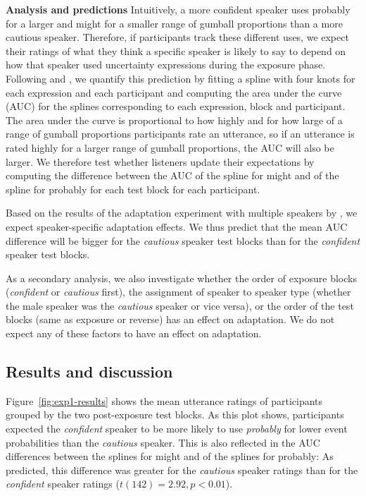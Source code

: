 \noindent \textbf{Analysis and predictions} 
Intuitively, a more confident speaker uses {\sc probably} for a larger and {\sc might} 
for a smaller range of gumball proportions than a more cautious speaker. Therefore, 
if participants track these different uses, we expect their ratings of what they think 
a specific speaker is likely to say to depend on how that speaker used 
uncertainty expressions during the exposure phase. Following \cite{Yildirim2016} and 
\cite{Schuster2018}, we quantify this prediction by fitting a spline with four knots for each 
expression and each participant and computing the area under the curve (AUC) for the splines 
corresponding to each expression, block and participant. The area under the curve is proportional 
to how highly and for how large of a range of gumball proportions participants rate an utterance, so 
if an utterance is rated highly for a larger range of gumball proportions, the AUC will also be larger. 
We therefore test whether listeners update their expectations by computing the difference between 
the AUC of the spline for {\sc might} and of the spline for {\sc probably} for each test block for each 
participant. 

Based on the results of the adaptation experiment with multiple speakers by \cite{Yildirim2016},
we expect speaker-specific adaptation effects. We thus predict that the mean AUC difference
will be bigger for the \emph{cautious} speaker test blocks than for the \emph{confident} speaker test blocks.

As a secondary analysis, we also investigate whether the order of exposure blocks 
(\textit{confident} or \textit{cautious} first), the assignment of speaker to speaker type 
(whether the male speaker was the \textit{cautious} speaker or vice versa), or the order 
of the test blocks (same as exposure or reverse) has an effect on adaptation. 
We do not expect any of these factors to have an effect on adaptation.



\subsection{Results and discussion}

Figure~\ref{fig:exp1-results} shows the mean utterance ratings of participants grouped by the two post-exposure test blocks. 
As this plot shows, participants expected the \textit{confident} speaker to be more likely to use \textit{probably} for lower 
event probabilities than the \textit{cautious} speaker. This is also reflected in the AUC differences between the splines for 
{\sc might} and of the splines for {\sc probably}: As predicted, this difference was greater for the  \emph{cautious }speaker 
ratings than for the \emph{confident} speaker ratings ($t(142)=2.92, p < 0.01$).

